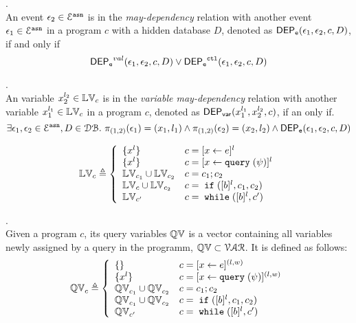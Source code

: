%
\begin{defn}.
\label{def:event_dep}
\\ 
An event $\mathtt{\epsilon}_2 \in \mathcal{E}^{\mathtt{{asn}}}$ is in the \emph{may-dependency} relation with another
event $\mathtt{\epsilon}_1 \in \mathcal{E}^{\mathtt{{asn}}}$ in a program ${c}$ with a hidden database $D$, denoted as $\mathsf{DEP_{\mathtt{e}}}(\mathtt{\epsilon}_1, \mathtt{\epsilon}_2, c, D)$,
if and only if
\[
\mathsf{DEP_{\mathtt{e}}}^{val}(\mathtt{\epsilon}_1, \mathtt{\epsilon}_2, c, D) 
\lor
\mathsf{DEP_{\mathtt{e}}}^{\mathtt{{ctl}}}(\mathtt{\epsilon}_1, \mathtt{\epsilon}_2, c, D) 
\] %
%
\end{defn}
%
\begin{defn}.
\label{def:var_dep}
\\
An variable ${x}_2^{l_2} \in \mathbb{LV}_{{c}}$ is in the \emph{variable may-dependency} relation with another
variable ${x}_1^{l_1} \in \mathbb{LV}_{{c}}$ in a program ${c}$, denoted as 
%
$\mathsf{DEP_{var}}({x}_1^{l_1}, {x}_2^{l_2}, {c})$, if an only if.
%
\[
\exists \mathtt{\epsilon}_1, \mathtt{\epsilon}_2 \in \mathcal{E}^{\mathtt{{asn}}}, D \in \mathcal{DB}. ~
\pi_{(1, 2)}{(\mathtt{\epsilon}_1)} = ({x}_1, l_1)
\land
\pi_{(1, 2)}{(\mathtt{\epsilon}_2)} = ({x}_2, l_2)
\land 
\mathsf{DEP_{\mathtt{e}}}(\mathtt{\epsilon}_1, \mathtt{\epsilon}_2, c, D)
\] 
%
%
\end{defn}
%
\begin{defn}
$$
  \lvar_{c} \triangleq
  \left\{
  \begin{array}{ll}
      \{{x}^l\}                   
      & {c} = [{\assign x e}]^{l} 
      \\
      \{{x}^l\}                   
      & {c} = [{\assign x \query(\qexpr)}]^{l} 
      \\
      \lvar_{{c_1}} \cup \lvar_{{c_2}}  
      & {c} = {c_1};{c_2}
      \\
      \lvar_{{c}} \cup \lvar_{{c_2}} 
      & {c} =\eif([\bexpr]^{l}, c_1, c_2) 
      \\
      \lvar_{{c}'}
      & {c}   = \ewhile ([\bexpr]^{l}, {c}')
\end{array}
\right.
$$
\end{defn}
%
\begin{defn}.
\\
Given a program $c$, its query variables $\mathbb{QV}$ is a vector containing all variables newly assigned by a query in the programm, $\mathbb{QV} \subset \mathcal{VAR}$.
It is defined as follows:
$$
  \qvar_{{c}} \triangleq
  \left\{
  \begin{array}{ll}
      \{\}                  
      & {c} = [{\assign x e}]^{(l, w)} 
      \\
      \{{x}^l\}                  
      & {c} = [{\assign x \query(\qexpr)}]^{(l, w)} 
      \\
      \qvar_{{c_1}} \cup \qvar_{{c_2}}  
      & {c} = {c_1};{c_2}
      \\
      \qvar_{{c_1}} \cup \qvar_{{c_2}} 
      & {c} =\eif([\bexpr]^{l}, c_1, c_2) 
      \\
      \qvar_{{c}'}
      & {c}   = \ewhile ([\bexpr]^{l}, {c}')
\end{array}
\right.
$$
\end{defn}
